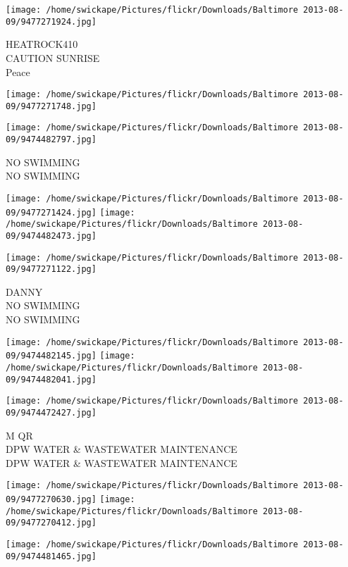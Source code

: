 \documentclass[10pt,letterpaper]{article}
\begin{document}
\vspace{0.25in}
\texttt{[image: /home/swickape/Pictures/flickr/Downloads/Baltimore 2013-08-09/9477271924.jpg]}

HEATROCK410\\
CAUTION SUNRISE\\
Peace
\pagebreak

\texttt{[image: /home/swickape/Pictures/flickr/Downloads/Baltimore 2013-08-09/9477271748.jpg]}

\vspace{0.25in}
\texttt{[image: /home/swickape/Pictures/flickr/Downloads/Baltimore 2013-08-09/9474482797.jpg]}

NO SWIMMING\\
NO SWIMMING
\pagebreak

\texttt{[image: /home/swickape/Pictures/flickr/Downloads/Baltimore 2013-08-09/9477271424.jpg]}
\texttt{[image: /home/swickape/Pictures/flickr/Downloads/Baltimore 2013-08-09/9474482473.jpg]}

\vspace{0.25in}
\texttt{[image: /home/swickape/Pictures/flickr/Downloads/Baltimore 2013-08-09/9477271122.jpg]}

DANNY\\
NO SWIMMING\\
NO SWIMMING
\pagebreak

\texttt{[image: /home/swickape/Pictures/flickr/Downloads/Baltimore 2013-08-09/9474482145.jpg]}
\texttt{[image: /home/swickape/Pictures/flickr/Downloads/Baltimore 2013-08-09/9474482041.jpg]}

\vspace{0.25in}
\texttt{[image: /home/swickape/Pictures/flickr/Downloads/Baltimore 2013-08-09/9474472427.jpg]}

M QR\\
DPW WATER \& WASTEWATER MAINTENANCE\\
DPW WATER \& WASTEWATER MAINTENANCE
\pagebreak

\texttt{[image: /home/swickape/Pictures/flickr/Downloads/Baltimore 2013-08-09/9477270630.jpg]}
\texttt{[image: /home/swickape/Pictures/flickr/Downloads/Baltimore 2013-08-09/9477270412.jpg]}

\texttt{[image: /home/swickape/Pictures/flickr/Downloads/Baltimore 2013-08-09/9474481465.jpg]}
\end{document}

